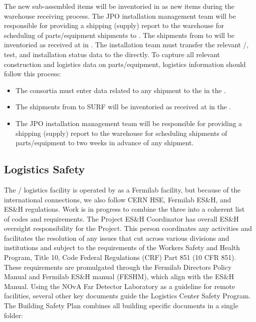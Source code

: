 The new sub-assembled items will be inventoried in  as new items during the warehouse receiving process.
The JPO installation management team will be responsible for providing a shipping (supply) report to the warehouse for scheduling of parts/equipment shipments to .
The shipments from  to  will be inventoried as received at  in .
The  installation team must transfer the relevant /, test, and installation status data to the  directly.
To capture all relevant construction and logistics data on parts/equipment, logistics information should follow this process:

\begin{itemize}
\item The consortia must enter data related to any shipment to the  in the .
\item The shipments from  to SURF will be inventoried as received at  in the .
\item The JPO installation management team will be responsible for providing a shipping (supply) report to the warehouse for scheduling shipments of parts/equipment to  two weeks in advance of any shipment.
\end{itemize}







\subsection{Logistics Safety}
\label{sec:fdsp-tc-log-safety}

The / logistics facility is operated by  
as a Fermilab facility, but because of the international connections, we also follow CERN HSE, Fermilab ES\&H, and  ES\&H regulations.  Work is in progress to combine the three into a coherent list of codes and requirements. The  Project ES\&H Coordinator has overall ES\&H oversight responsibility for the  Project.  This person coordinates any activities and facilitates the resolution of any issues that cut across various divisions and institutions and subject to the requirements of the  Workers Safety and Health Program, Title 10, Code Federal Regulations (CRF) Part 851 (10 CFR 851). These requirements are promulgated through the Fermilab Directors Policy Manual and Fermilab ES\&H manual (FESHM), which align with the  ES\&H Manual. 
Using the NOvA Far Detector Laboratory as a guideline for remote facilities, several other key documents guide the Logistics Center Safety Program.  The Building Safety Plan combines all building specific documents in a single folder:

